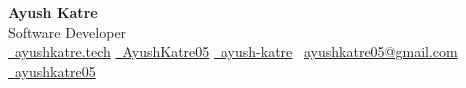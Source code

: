\begin{center}
  {\LARGE \textbf{Ayush Katre}}\\
  Software Developer \\[0.3em]
  \href{https://ayushkatre.tech}{\faGlobe \ ayushkatre.tech} \quad
  \href{https://github.com/AyushKatre05}{\faGithub \ AyushKatre05} \quad
  \href{https://www.linkedin.com/in/ayush-katre/}{\faLinkedin \ ayush-katre} \quad
  \faEnvelope \ \href{mailto:ayushkatre05@gmail.com}{ayushkatre05@gmail.com} \quad
  \href{https://x.com/ayush_katre_05}{\faTwitter \ ayushkatre05}
\end{center}
